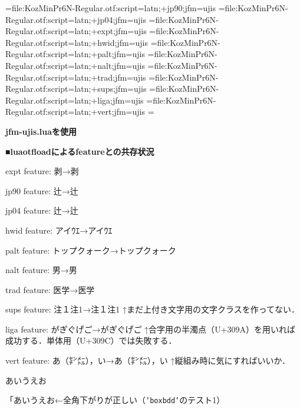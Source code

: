 

\jfont\jisninety={file:KozMinPr6N-Regular.otf:script=latn;+jp90;jfm=ujis}
\jfont\jisfour={file:KozMinPr6N-Regular.otf:script=latn;+jp04;jfm=ujis}
\jfont\jisexpt={file:KozMinPr6N-Regular.otf:script=latn;+expt;jfm=ujis}
\jfont\jishwid={file:KozMinPr6N-Regular.otf:script=latn;+hwid;jfm=ujis}
\jfont\jispalt={file:KozMinPr6N-Regular.otf:script=latn;+palt;jfm=ujis}
\jfont\jisnalt={file:KozMinPr6N-Regular.otf:script=latn;+nalt;jfm=ujis}
\jfont\jistrad={file:KozMinPr6N-Regular.otf:script=latn;+trad;jfm=ujis}
\jfont\jissups={file:KozMinPr6N-Regular.otf:script=latn;+sups;jfm=ujis}
\jfont\jisliga={file:KozMinPr6N-Regular.otf:script=latn;+liga;jfm=ujis}
\jfont\jisvert={file:KozMinPr6N-Regular.otf:script=latn;+vert;jfm=ujis}
\parskip=\smallskipamount{}\zw

{\noindent\bf\tengt jfm-ujis.luaを使用}

\bigskip

{\noindent\bf\tengt ■luaotf\/loadによるfeatureとの共存状況}

{\tentt expt} feature: 剥→{\jisexpt 剥}

{\tentt jp90} feature: 辻→{\jisninety 辻}

{\tentt jp04} feature: 辻→{\jisfour 辻}

{\tentt hwid} feature: アイｳｴ→{\jishwid アイｳｴ}

{\tentt palt} feature: トップクォーク→{\jispalt トップクォーク}\hfil\break

{\tentt nalt} feature: 男→{\jisnalt 男}

{\tentt trad} feature: 医学→{\jistrad 医学}

{\tentt sups} feature: 注１注1→{\jissups 注１注1}\hfil\break
↑まだ上付き文字用の文字クラスを作ってない．

{\tentt liga} feature: か゚き゚く゚け゚こ゚→{\jisliga か゚き゚く゚け゚こ゚}\hfil\break
↑合字用の半濁点（{\tentt U+309A}）を用いれば成功する．単体用（{\tentt U+309C}）では失敗する．%

{\tentt vert} feature: あ（㌢㍍），い→{\jisvert あ（㌢㍍），い}\hfil\break
↑縦組み時に気にすればいいか．

\bigskip

\noindent あいうえお

「あいうえお←全角下がりが正しい（{\tt'boxbdd'}のテスト1）


